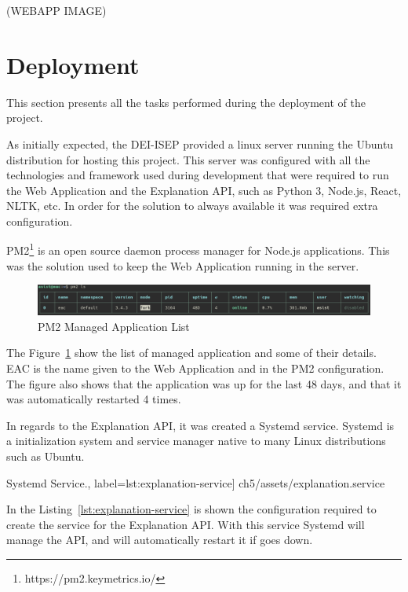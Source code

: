 (WEBAPP IMAGE) %

\section{Deployment}

This section presents all the tasks performed during the deployment of the project.

As initially expected, the DEI-ISEP provided a linux server running the Ubuntu distribution for hosting this project.
This server was configured with all the technologies and framework used during development that were required to run the Web Application and the Explanation API, such as Python 3, Node.js, React, NLTK, etc.
In order for the solution to always available it was required extra configuration.

PM2\footnote{https://pm2.keymetrics.io/} is an open source daemon process manager for Node.js applications.
This was the solution used to keep the Web Application running in the server.

\begin{figure}[H]
\centering
\includegraphics[width=\textwidth,keepaspectratio]{ch5/assets/pm2ls.png}
\caption[PM2 Managed Application List]{PM2 Managed Application List}
\label{fig:pm2}
\end{figure}

The Figure~\ref{fig:pm2} show the list of managed application and some of their details.
EAC is the name given to the Web Application and in the PM2 configuration.
The figure also shows that the application was up for the last 48 days, and that it was automatically restarted 4 times.

In regards to the Explanation API, it was created a Systemd service.
Systemd is a initialization system and service manager native to many Linux distributions such as Ubuntu.

\begin{center}
\begin{minipage}{0.95\linewidth}
 Systemd Service.,
label=lst:explanation-service]
{ch5/assets/explanation.service}
\end{minipage}
\end{center}

In the Listing~\ref{lst:explanation-service} is shown the configuration required to create the service for the Explanation API.
With this service Systemd will manage the API, and will automatically restart it if goes down.

